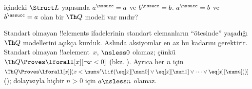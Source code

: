 \begin{prob}
 içindeki $\Struct L$ yapısında
$a^\nssucc=a$ ve $b^\nssucc=b$. $a^\nssucc=b$ ve $b^\nssucc=a$ olan
bir $\Th Q$ modeli var mıdır?
\end{prob}

\begin{explain}
Standart olmayan !!{element}s ifadelerinin standart elemanların
``ötesinde'' yaşadığı $\Th Q$ modellerini açıkça kurduk. Aslında
aksiyomlar en az bu kadarını gerektirir. Standart olmayan
!!a{element}~$x$, ${}\nsless0$ olamaz; çünkü
$\Th Q\Proves\lforall[x][\lnot x<0]$
(bkz. ). Ayrıca her $n$ için
$\Th Q\Proves\lforall[x][(x<\num n'\lif
(\eq[x][\num0]\lor\eq[x][\num1]\lor\dots\lor\eq[x][\num n]))]$
(); dolayısıyla hiçbir $n>0$ için
$a\nsless n$ olamaz.
\end{explain}


